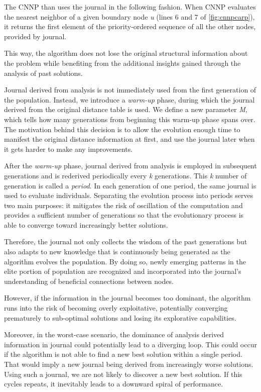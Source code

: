 \documentclass[twoside]{ctuthesis}
\theoremstyle{plain}
\theoremstyle{definition}
\theoremstyle{note}
\begin{document}
The CNNP than uses the journal in the following fashion. When CNNP evaluates the nearest neighbor of a given boundary node \emph{u} (lines 6 and 7 of \ref{fig:cnnpcarp}), it returns the first element of the priority-ordered sequence of all the other nodes, provided by journal.

This way, the algorithm does not lose the original structural information about the problem while benefiting from the additional insights gained through the analysis of past solutions. 




Journal derived from analysis is not immediately used from the first generation of the population. Instead, we introduce a \emph{warm-up} phase, during which the journal derived from the original distance table is used. We define a new parameter \emph{M}, which tells how many generations from beginning this warm-up phase spans over.
The motivation behind this decision is to allow the evolution enough time to manifest the original distance information at first, and use the journal later when it gets harder to make any improvements.

After the \emph{warm-up} phase, journal derived from analysis is employed in subsequent generations and is rederived periodically every \emph{k} generations. This \emph{k} number of generation is called a \emph{period}. In each generation of one period, the same journal is used to evaluate individuals. Separating the evolution process into periods serves two main purposes: it mitigates the risk of oscillation of the computation and provides a sufficient number of generations so that the evolutionary process is able to converge toward increasingly better solutions.


Therefore, the journal not only collects the wisdom of the past generations but also adapts to new knowledge that is continuously being generated as the algorithm evolves the population. By doing so, newly emerging patterns in the elite portion of population are recognized and incorporated into the journal's understanding of beneficial connections between nodes. 

However, if the information in the journal becomes too dominant, the algorithm runs into the risk of becoming overly exploitative, potentially converging prematurely to sub-optimal solutions and losing its explorative capabilities. 

Moreover, in the worst-case scenario, the dominance of analysis derived information in journal could potentially lead to a diverging loop. This could occur if the algorithm is not able to find a new best solution within a single period. That would imply a new journal being derived from increasingly worse solutions. Using such a journal, we are not likely to discover a new best solution. If this cycles repeats, it inevitably leads to a downward spiral of performance.
\end{document}

